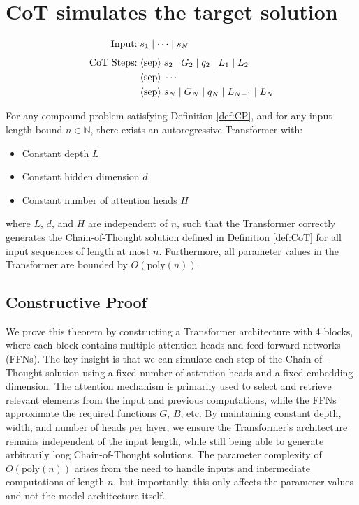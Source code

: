 

\section{CoT simulates the target solution}

\begin{definition}
  \vspace{0em}
    \small\begin{align*}
    \vspace{-0.5em}
        \text{Input:} & \; s_1 \mid \cdots \mid s_N \\[1ex]
        \text{CoT Steps:} & \; \langle\text{sep}\rangle \; s_2 \mid G_2 \mid q_2 \mid L_1 \mid L_2 \\
        & \; \langle\text{sep}\rangle \; \cdots \\
        & \; \langle\text{sep}\rangle \; s_{N} \mid G_N \mid q_N \mid L_{N-1} \mid L_N
    \end{align*}
    \label{def:CoT_appendix}
\end{definition}

\begin{proposition}
\label{thm:CoT_implementation}
For any compound problem satisfying Definition \ref{def:CP}, and for any input length bound $n \in \mathbb{N}$, there exists an autoregressive Transformer with:
\begin{itemize}
\item Constant depth $L$
\item Constant hidden dimension $d$
\item Constant number of attention heads $H$
\end{itemize}
where $L$, $d$, and $H$ are independent of $n$, such that the Transformer correctly generates the Chain-of-Thought solution defined in Definition \ref{def:CoT} for all input sequences of length at most $n$. Furthermore, all parameter values in the Transformer are bounded by $O(\text{poly}(n))$.
\end{proposition}

\subsection{Constructive Proof}
We prove this theorem by constructing a Transformer architecture with 4 blocks, where each block contains multiple attention heads and feed-forward networks (FFNs). The key insight is that we can simulate each step of the Chain-of-Thought solution using a fixed number of attention heads and a fixed embedding dimension.
The attention mechanism is primarily used to select and retrieve relevant elements from the input and previous computations, while the FFNs approximate the required functions $G$, $B$, etc. By maintaining constant depth, width, and number of heads per layer, we ensure the Transformer's architecture remains independent of the input length, while still being able to generate arbitrarily long Chain-of-Thought solutions.
The parameter complexity of $O(\text{poly}(n))$ arises from the need to handle inputs and intermediate computations of length $n$, but importantly, this only affects the parameter values and not the model architecture itself.

